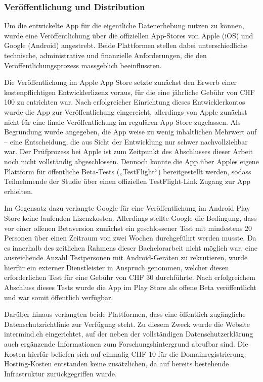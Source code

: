\subsubsection{Veröffentlichung und Distribution}

Um die entwickelte App für die eigentliche Datenerhebung nutzen zu können, wurde eine Veröffentlichung über die offiziellen App-Stores von Apple (iOS) und Google (Android) angestrebt. Beide Plattformen stellen dabei unterschiedliche technische, administrative und finanzielle Anforderungen, die den Veröffentlichungsprozess massgeblich beeinflussten.

Die Veröffentlichung im Apple App Store setzte zunächst den Erwerb einer kostenpflichtigen Entwicklerlizenz voraus, für die eine jährliche Gebühr von CHF 100 zu entrichten war. Nach erfolgreicher Einrichtung dieses Entwicklerkontos wurde die App zur Veröffentlichung eingereicht, allerdings von Apple zunächst nicht für eine finale Veröffentlichung im regulären App Store zugelassen. Als Begründung wurde angegeben, die App weise zu wenig inhaltlichen Mehrwert auf – eine Entscheidung, die aus Sicht der Entwicklung nur schwer nachvollziehbar war. Der Prüfprozess bei Apple ist zum Zeitpunkt des Abschlusses dieser Arbeit noch nicht vollständig abgeschlossen. Dennoch konnte die App über Apples eigene Plattform für öffentliche Beta-Tests („TestFlight“) bereitgestellt werden, sodass Teilnehmende der Studie über einen offiziellen TestFlight-Link Zugang zur App erhielten.

Im Gegensatz dazu verlangte Google für eine Veröffentlichung im Android Play Store keine laufenden Lizenzkosten. Allerdings stellte Google die Bedingung, dass vor einer offenen Betaversion zunächst ein geschlossener Test mit mindestens 20 Personen über einen Zeitraum von zwei Wochen durchgeführt werden musste. Da es innerhalb des zeitlichen Rahmens dieser Bachelorarbeit nicht möglich war, eine ausreichende Anzahl Testpersonen mit Android-Geräten zu rekrutieren, wurde hierfür ein externer Dienstleister in Anspruch genommen, welcher diesen erforderlichen Test für eine Gebühr von CHF 30 durchführte. Nach erfolgreichem Abschluss dieses Tests wurde die App im Play Store als offene Beta veröffentlicht und war somit öffentlich verfügbar.

Darüber hinaus verlangten beide Plattformen, dass eine öffentlich zugängliche Datenschutzrichtlinie zur Verfügung steht. Zu diesem Zweck wurde die Website intermind.ch eingerichtet, auf der neben der vollständigen Datenschutzerklärung auch ergänzende Informationen zum Forschungshintergrund abrufbar sind. Die Kosten hierfür beliefen sich auf einmalig CHF 10 für die Domainregistrierung; Hosting-Kosten entstanden keine zusätzlichen, da auf bereits bestehende Infrastruktur zurückgegriffen wurde.

